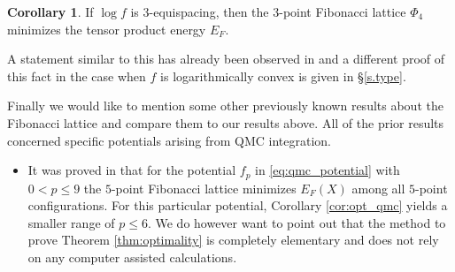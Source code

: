 \documentclass[a4paper,12pt]{article}
\numberwithin{equation}{section}
\theoremstyle{definition}
\newtheorem{cor}[thm]{Corollary}
\newcommand{\bbN}{\mathbb{N}}
\newcommand{\cS}{\mathcal{S}}
\begin{document}
\begin{cor}\label{cor:3}
    If  $\log f$ is $3$-equispacing, then the  $3$-point Fibonacci lattice $\Phi_4$ minimizes the  tensor product  energy $E_F$.
    \end{cor}
   \noindent  A  statement similar to this has already been observed in \cite{Nag25b} and a different proof of this fact in the case when $f$ is logarithmically convex is given in \S\ref{s.type}. 


Finally we would like to mention some other previously known results  about the Fibonacci lattice  and compare them to our results above. All of the prior results concerned specific potentials arising from QMC integration. 

\begin{itemize}
\item It was proved in \cite{Nag25b} that for the potential $f_p$ in \eqref{eq:qmc_potential} with $0 < p \leq 9$ the $5$-point Fibonacci lattice minimizes $E_F(X)$ among all $5$-point configurations. For this particular potential, Corollary \ref{cor:opt_qmc} yields a smaller range of $p \leq 6$. %
We do however want to point out that the method to prove Theorem \ref{thm:optimality} is completely elementary and does not rely on any computer assisted calculations.




\end{itemize}
\end{document}
